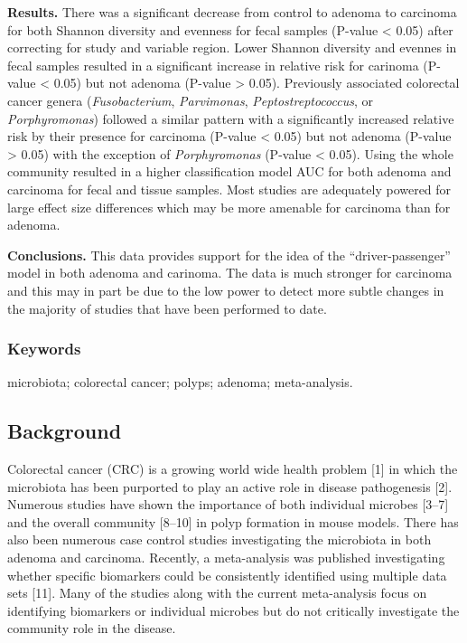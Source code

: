 \documentclass[12pt,]{article}
\begin{document}
\textbf{Results.} There was a significant decrease from control to
adenoma to carcinoma for both Shannon diversity and evenness for fecal
samples (P-value \textless{} 0.05) after correcting for study and
variable region. Lower Shannon diversity and evennes in fecal samples
resulted in a significant increase in relative risk for carinoma
(P-value \textless{} 0.05) but not adenoma (P-value \textgreater{}
0.05). Previously associated colorectal cancer genera
(\emph{Fusobacterium}, \emph{Parvimonas}, \emph{Peptostreptococcus}, or
\emph{Porphyromonas}) followed a similar pattern with a significantly
increased relative risk by their presence for carcinoma (P-value
\textless{} 0.05) but not adenoma (P-value \textgreater{} 0.05) with the
exception of \emph{Porphyromonas} (P-value \textless{} 0.05). Using the
whole community resulted in a higher classification model AUC for both
adenoma and carcinoma for fecal and tissue samples. Most studies are
adequately powered for large effect size differences which may be more
amenable for carcinoma than for adenoma.

\textbf{Conclusions.} This data provides support for the idea of the
``driver-passenger'' model in both adenoma and carinoma. The data is
much stronger for carcinoma and this may in part be due to the low power
to detect more subtle changes in the majority of studies that have been
performed to date.

\subsubsection{Keywords}\label{keywords}

microbiota; colorectal cancer; polyps; adenoma; meta-analysis.

\newpage

\subsection{Background}\label{background}

Colorectal cancer (CRC) is a growing world wide health problem {[}1{]}
in which the microbiota has been purported to play an active role in
disease pathogenesis {[}2{]}. Numerous studies have shown the importance
of both individual microbes {[}3--7{]} and the overall community
{[}8--10{]} in polyp formation in mouse models. There has also been
numerous case control studies investigating the microbiota in both
adenoma and carcinoma. Recently, a meta-analysis was published
investigating whether specific biomarkers could be consistently
identified using multiple data sets {[}11{]}. Many of the studies along
with the current meta-analysis focus on identifying biomarkers or
individual microbes but do not critically investigate the community role
in the disease.
\end{document}
